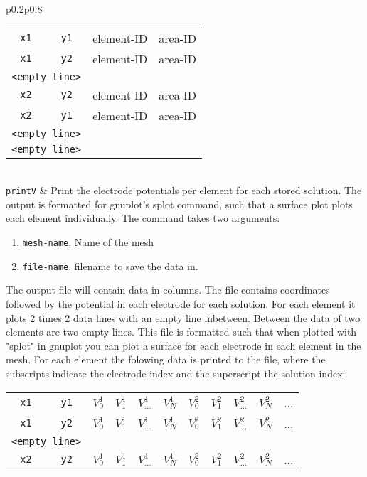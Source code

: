 \documentclass[noshowpacs,preprintnumbers,amsmath,amssymb, letter]{revtex4}
\begin{document}
\begin{longtable}{p{}p{}}
\begin{tabular}{cccc}
	\texttt{x1} & \texttt{y1} & element-ID & area-ID\\
	\texttt{x1} & \texttt{y2} & element-ID & area-ID \\
	\multicolumn{2}{l}{\texttt{<empty line>}}\\
	\texttt{x2} & \texttt{y2} & element-ID & area-ID \\
	\texttt{x2} & \texttt{y1} & element-ID & area-ID \\
	\multicolumn{2}{l}{\texttt{<empty line>}}\\
	\multicolumn{2}{l}{\texttt{<empty line>}}\\
\end{tabular}\\
\texttt{printV}		& Print the electrode potentials per element for each stored solution. The output is formatted for gnuplot's splot command, such that a surface plot plots each element individually. The command takes two arguments:
\begin{enumerate}
\item \texttt{mesh-name}, Name of the mesh
\item \texttt{file-name}, filename to save the data in.
\end{enumerate}
The output file will contain data in columns. The file contains coordinates followed by the potential in each electrode for each solution. For each element it plots 2 times 2 data lines with an empty line inbetween. Between the data of two elements are two empty lines. This file is formatted such that when plotted with "splot" in gnuplot you can plot a surface for each electrode in each element in the mesh. For each element the folowing data is printed to the file, where the subscripts indicate the electrode index and the superscript the solution index:\newline 
\begin{tabular}{ccccccccccc}
	\texttt{x1} & \texttt{y1} & $V_0^1$ & $V_1^1$ & $V_{...}^1$ & $V_N^1$ & $V_0^2$ & $V_1^2$ & $V_{...}^2$ & $V_N^2$& ...\\
	\texttt{x1} & \texttt{y2} & $V_0^1$ & $V_1^1$ & $V_{...}^1$ & $V_N^1$ & $V_0^2$ & $V_1^2$ & $V_{...}^2$ & $V_N^2$& ...\\
	\multicolumn{2}{l}{\texttt{<empty line>}}\\
	\texttt{x2} & \texttt{y2} & $V_0^1$ & $V_1^1$ & $V_{...}^1$ & $V_N^1$ & $V_0^2$ & $V_1^2$ & $V_{...}^2$ & $V_N^2$& ...\\

\end{tabular}
\end{longtable}
\end{document}

